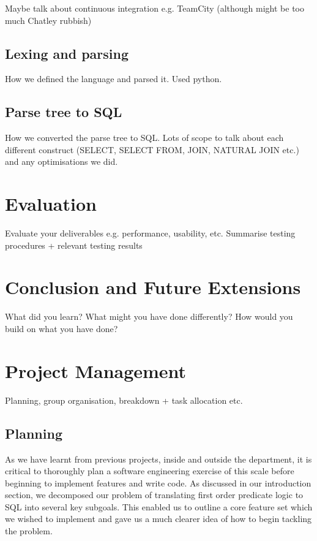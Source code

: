 \documentclass[a4paper, 11pt]{article}
\begin{document}
    Maybe talk about continuous integration e.g. TeamCity (although might be
    too much Chatley rubbish)

  \subsection{Lexing and parsing}
    How we defined the language and parsed it. Used python.

  \subsection{Parse tree to SQL}
    How we converted the parse tree to SQL. Lots of scope to talk about each
    different construct (SELECT, SELECT FROM, JOIN, NATURAL JOIN etc.) and
    any optimisations we did.

\section{Evaluation}
  Evaluate your deliverables e.g. performance, usability, etc.
  Summarise testing procedures + relevant testing results

\section{Conclusion and Future Extensions}
  What did you learn? What might you have done differently?
  How would you build on what you have done?

\section{Project Management}
  Planning, group organisation, breakdown + task allocation etc.

  \subsection{Planning}

    As we have learnt from previous projects, inside and outside the
    department, it is critical to thoroughly plan a software engineering
    exercise of this scale before beginning to implement features and write
    code. As discussed in our introduction section, we decomposed our problem
    of translating first order predicate logic to SQL into several key
    subgoals. This enabled us to outline a core feature set which we wished to
    implement and gave us a much clearer idea of how to begin tackling the
    problem.
\end{document}
